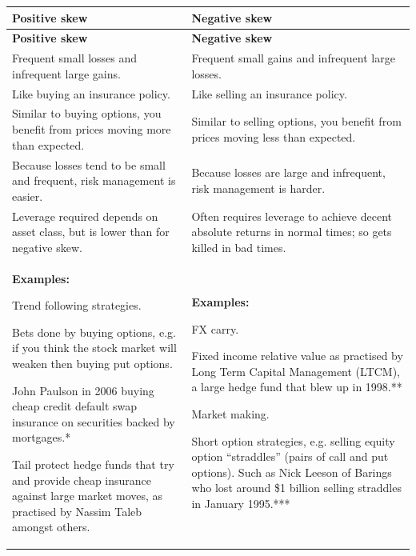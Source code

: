 \begin{englishtableblock} \begin{longtable}{@{} p{} p{}@{}}
\toprule
\textbf{Positive skew} & \textbf{Negative skew} \\
\midrule
\endfirsthead \toprule \textbf{Positive skew} & \textbf{Negative skew} \\
\midrule
\endhead Frequent small losses and infrequent large gains. &Frequent small gains and infrequent large losses. \\
Like buying an insurance policy. &Like selling an insurance policy. \\
Similar to buying options, you benefit from prices moving more than expected. &Similar to selling options, you benefit from prices moving less than expected. \\
Because losses tend to be small and frequent, risk management is easier. &Because losses are large and infrequent, risk management is harder. \\
Leverage required depends on asset class, but is lower than for negative skew. &Often requires leverage to achieve decent absolute returns in normal times; so gets killed in bad times. \\
\textbf{Examples:}
\par Trend following strategies.
\par Bets done by buying options, e.g. if you think the stock market will weaken then buying put options.
\par John Paulson in 2006 buying cheap credit default swap insurance on securities backed by mortgages.*
\par Tail protect hedge funds that try and provide cheap insurance against large market moves, as practised by Nassim Taleb amongst others. &\textbf{Examples:}
\par FX carry.
\par Fixed income relative value as practised by Long Term Capital Management (LTCM), a large hedge fund that blew up in 1998.**
\par Market making.
\par Short option strategies, e.g. selling equity option ``straddles'' (pairs of call and put options). Such as Nick Leeson of Barings who lost around \$1 billion selling straddles in January 1995.*** \\
\bottomrule
\end{longtable}
\addtocounter{table}{-1} \end{englishtableblock}

